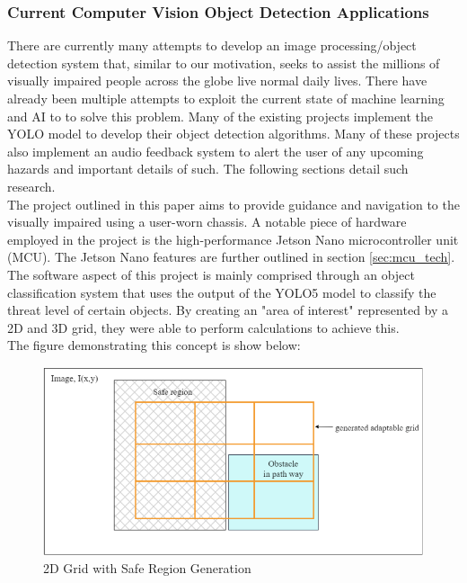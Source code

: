 \subsubsection{Current Computer Vision Object Detection Applications}

\noindent There are currently many attempts to develop an image processing/object detection system that, similar to our motivation, seeks to assist the millions of visually impaired people across the globe live normal daily lives. There have already been multiple attempts to exploit the current state of machine learning and AI to to solve this problem. Many of the existing projects implement the YOLO model to develop their object detection algorithms. Many of these projects also implement an audio feedback system to alert the user of any upcoming hazards and important details of such. The following sections detail such research. \\
    
\noindent The project outlined in this paper \cite{CVRef1} aims to provide guidance and navigation to the visually impaired using a user-worn chassis. A notable piece of hardware employed in the project is the high-performance Jetson Nano microcontroller unit (MCU). The Jetson Nano features are further outlined in section \ref{sec:mcu_tech}. \\

\noindent The software aspect of this project is mainly comprised through an object classification system that uses the output of the YOLO5 model to classify the threat level of certain objects. By creating an "area of interest" represented by a 2D and 3D grid, they were able to perform calculations to achieve this. \\

\noindent The figure demonstrating this concept is show below:
				
\begin{figure}[H]
	\centering
	\includegraphics[width=\textwidth]{./Images/Figure1_Grid_Detection.png}
	\caption{\label{fig:Grid-Generatio}2D Grid with Safe Region Generation}
\end{figure}

